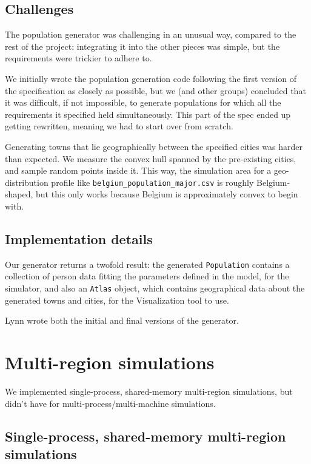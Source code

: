 \documentclass[a4paper,12pt]{article}
\begin{document}
\subsection{Challenges}
The population generator was challenging in an unusual way, compared to the rest of the project: integrating it into the other pieces was simple, but the requirements were trickier to adhere to.

We initially wrote the population generation code following the first version of the specification as closely as possible, but we (and other groups) concluded that it was difficult, if not impossible, to generate populations for which all the requirements it specified held simultaneously. This part of the spec ended up getting rewritten, meaning we had to start over from scratch.

Generating towns that lie geographically between the specified cities was harder than expected. We measure the convex hull spanned by the pre-existing cities, and sample random points inside it. This way, the simulation area for a geo-distribution profile like \texttt{belgium\_population\_major.csv} is roughly Belgium-shaped, but this only works because Belgium is approximately convex to begin with.

\subsection{Implementation details}
Our generator returns a twofold result: the generated \texttt{Population} contains a collection of person data fitting the parameters defined in the model, for the simulator, and also an \texttt{Atlas} object, which contains geographical data about the generated towns and cities, for the Visualization tool to use.

Lynn wrote both the initial and final versions of the generator.

\section{Multi-region simulations}

We implemented single-process, shared-memory multi-region simulations, but didn't have for multi-process/multi-machine simulations.

\subsection{Single-process, shared-memory multi-region simulations}
\end{document}

